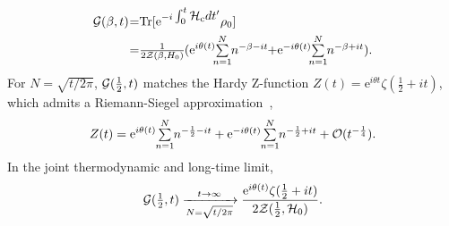 \documentclass[aps,pra,twocolumn,superscriptaddress,preprintnumbers,amsmath,amssymb]{revtex4-2}
\begin{document}
\begin{align}\label{Loschmidt amplitude}
\mathcal{G}(\beta,t)\!\!\!\;
=&\mathrm{Tr}[\mathrm{e}^{-i\textstyle\int_{0}^{t}\mathcal{H}_{\rm c} dt'}\rho_0]\notag\\
=&\tfrac{1}{2\mathcal{Z}(\beta,H_0)}\;\!\!(\mathrm{e}^{i \theta(t)}\!\textstyle\sum\limits_{\mathclap{n=1}}^{\mathclap{N}}n^{-\beta - it}\!\;\!\!\;\!\! +\!\;\!\!\mathrm{e}^{-i \theta(t)}\textstyle\!\sum\limits_{\mathclap{n=1}}^{\mathclap{N}}n^{-\beta + it}).
\end{align} 
For $N=\sqrt{t/{2\pi}}$, ${\cal G}(\tfrac{1}{2},t)$ matches the Hardy 
Z-function $Z(t)=\mathrm{e}^{i\theta t}\zeta(\tfrac{1}{2}+it)$, which admits a
Riemann-Siegel approximation~\cite{de2011high},
\begin{equation}
   Z(t) =\mathrm{e}^{i\theta(t)}\textstyle\sum\limits_{\mathclap{n=1}}^{\mathclap{N}} n^{-\frac{1}{2}-it} 
         +\mathrm{e}^{-i\theta(t)}\textstyle\sum\limits_{\mathclap{n=1}}^{\mathclap{N}} n^{-\frac{1}{2}+it} 
         + \mathcal{O}(t^{-\frac{1}{4}}).
   \label{eq:RS_formula}
\end{equation}
In the joint thermodynamic and long-time limit,
\begin{equation}\label{eq:C}
{\cal G}(\tfrac{1}{2},t) \xrightarrow[N=\sqrt{t/2\pi}]{t\to\infty} \frac{\mathrm{e}^{i\theta(t)}\zeta(\tfrac{1}{2} + it)}{2{\cal 
Z}(\tfrac{1}{2},\mathcal{H}_0)} .
\end{equation}
\end{document}
